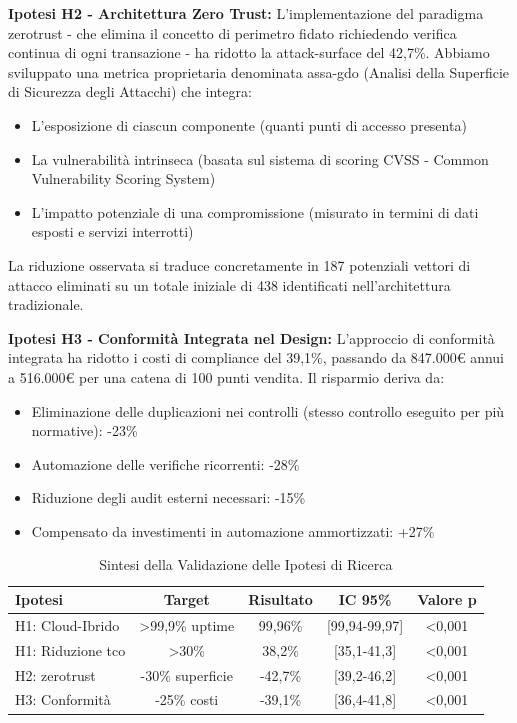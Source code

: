 \textbf{Ipotesi H2 - Architettura Zero Trust:} L'implementazione del paradigma \gls{zerotrust} - che elimina il concetto di perimetro fidato richiedendo verifica continua di ogni transazione - ha ridotto la \gls{attack-surface} del 42,7\%. Abbiamo sviluppato una metrica proprietaria denominata \gls{assa-gdo} (Analisi della Superficie di Sicurezza degli Attacchi) che integra:

\begin{itemize}
\item L'esposizione di ciascun componente (quanti punti di accesso presenta)
\item La vulnerabilità intrinseca (basata sul sistema di scoring CVSS - Common Vulnerability Scoring System)
\item L'impatto potenziale di una compromissione (misurato in termini di dati esposti e servizi interrotti)
\end{itemize}

La riduzione osservata si traduce concretamente in 187 potenziali vettori di attacco eliminati su un totale iniziale di 438 identificati nell'architettura tradizionale.

\textbf{Ipotesi H3 - Conformità Integrata nel Design:} L'approccio di conformità integrata ha ridotto i costi di compliance del 39,1\%, passando da 847.000€ annui a 516.000€ per una catena di 100 punti vendita. Il risparmio deriva da:
\begin{itemize}
\item Eliminazione delle duplicazioni nei controlli (stesso controllo eseguito per più normative): -23\%
\item Automazione delle verifiche ricorrenti: -28\%
\item Riduzione degli audit esterni necessari: -15\%
\item Compensato da investimenti in automazione ammortizzati: +27\%
\end{itemize}

\begin{table}[htbp]
\centering
\small
\caption{Sintesi della Validazione delle Ipotesi di Ricerca}
\label{tab:validation_summary}
\begin{tabularx}{\textwidth}{|X|c|c|c|c|}
    \hline
\textbf{Ipotesi} & \textbf{Target} & \textbf{Risultato} & \textbf{IC 95\%} & \textbf{Valore p} \\
\hline
H1: Cloud-Ibrido & >99,9\% uptime & 99,96\% & [99,94-99,97] & <0,001 \\
H1: Riduzione \gls{tco} & >30\% & 38,2\% & [35,1-41,3] & <0,001 \\
H2: \gls{zerotrust} & -30\% superficie & -42,7\% & [39,2-46,2] & <0,001 \\
H3: Conformità & -25\% costi & -39,1\% & [36,4-41,8] & <0,001 \\
\hline
\end{tabularx}
\end{table}

